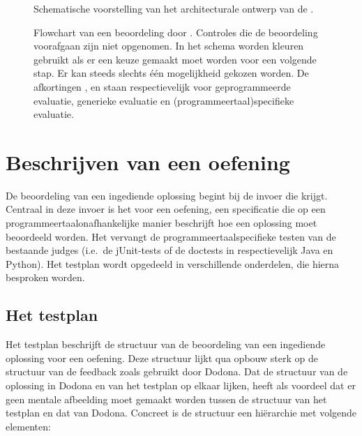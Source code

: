 \begin{figure}
    \centering
    
    \caption{Schematische voorstelling van het architecturale ontwerp van de \tested{}.}
    \label{fig:universal-judge}
\end{figure}

\begin{figure}
    \centering
    
    \caption{
        Flowchart van een beoordeling door \tested{}.
        Controles die de beoordeling voorafgaan zijn niet opgenomen.
        In het schema worden kleuren gebruikt als er een keuze gemaakt moet worden voor een volgende stap.
        Er kan steeds slechts één mogelijkheid gekozen worden.
        De afkortingen ,  en  staan respectievelijk voor geprogrammeerde evaluatie, generieke evaluatie en (programmeertaal)specifieke evaluatie.
    }
    \label{fig:tested-flow}
\end{figure}


\section{Beschrijven van een oefening}\label{sec:testplan}

De beoordeling van een ingediende oplossing begint bij de invoer die \tested{} krijgt.
Centraal in deze invoer is het  voor een oefening, een specificatie die op een programmeertaalonafhankelijke manier beschrijft hoe een oplossing moet beoordeeld worden.
Het vervangt de programmeertaalspecifieke testen van de bestaande judges (i.e.\ de jUnit-tests of de doctests in respectievelijk Java en Python).
Het testplan  wordt opgedeeld in verschillende onderdelen, die hierna besproken worden.

\subsection{Het testplan}\label{subsec:het-testplan}

Het testplan  beschrijft de structuur van de beoordeling van een ingediende oplossing voor een oefening.
Deze structuur lijkt qua opbouw sterk op de structuur van de feedback zoals gebruikt door Dodona.
Dat de structuur van de oplossing in Dodona en van het testplan op elkaar lijken, heeft als voordeel dat er geen mentale afbeelding moet gemaakt worden tussen de structuur van het testplan en dat van Dodona.
Concreet is de structuur een hiërarchie met volgende elementen:

